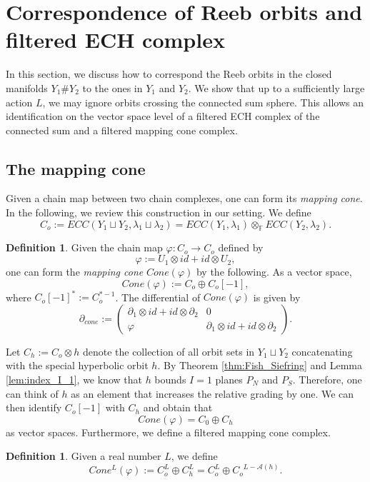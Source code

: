 \documentclass{article}
\numberwithin{equation}{section}
\theoremstyle{definition}
\newtheorem{definition}[theorem]{Definition}
\newcommand{\F}{\mathbb{F}}
\begin{document}
\section{Correspondence of Reeb orbits and filtered ECH complex}
\label{sec:correspondence}
In this section, we discuss how to correspond the Reeb orbits in the closed manifolds $Y_1 \# Y_2$ to the ones in $Y_1$ and $Y_2$. We  show that up to a sufficiently large action $L$, we may ignore orbits crossing the connected sum sphere. This allows an identification on the vector space level of a filtered ECH complex of the connected sum and a filtered mapping cone complex.

\subsection{The mapping cone}
\label{sec:mapping_cone}
Given a chain map between two chain complexes, one can form its \emph{mapping cone}. In the following, we review this construction in our setting. We define 
$$C_o := ECC(Y_1 \sqcup Y_2, \lambda_1 \sqcup \lambda_2) = ECC(Y_1, \lambda_1)\otimes_{\F} ECC(Y_2, \lambda_2).$$

\begin{definition}
    Given the chain map $\varphi: C_o \to C_o$ defined by 
    $$\varphi:= U_1 \otimes id + id \otimes U_2,$$
    one can form the \emph{mapping cone} $Cone(\varphi)$ by the following. As a vector space, 
    $$Cone(\varphi) := C_o \oplus C_o[-1],$$ 
    where $C_o[-1]^*:=C_o^{*-1}$. The differential of $Cone(\varphi)$ is given by
\begin{equation*}
\partial_{cone} := 
\begin{pmatrix}
\partial_1 \otimes id + id \otimes \partial_2 & 0 \\
\varphi & \partial_1 \otimes id + id \otimes \partial_2
\end{pmatrix}.
\end{equation*}
\end{definition}
Let $C_h:= C_o \otimes h$ denote the collection of all orbit sets in $Y_1\sqcup Y_2$ concatenating with the special hyperbolic orbit $h$. By Theorem \ref{thm:Fish_Siefring} and Lemma \ref{lem:index_I_1}, we know that $h$ bounds $I=1$ planes $P_N$ and $P_S$. Therefore, one can think of $h$ as an element that increases the relative grading by one. We can then identify $C_o[-1]$ with $C_h$ and obtain that $$Cone(\varphi) = C_0 \oplus C_h$$ 
as vector spaces. Furthermore, we define a filtered mapping cone complex.
\begin{definition}
\label{def:Cone_L}
    Given a real number $L$, we define 
    $$Cone^L(\varphi):= C_o^L \oplus C_h^L = C_o^L \oplus {C_o}^{L-\mathcal{A}(h)}.$$
\end{definition}
\end{document}
